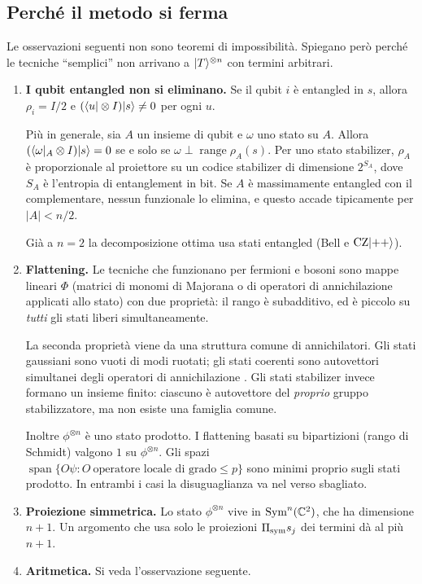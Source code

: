 \subsection{Perché il metodo si ferma}\label{sec:barriers}

Le osservazioni seguenti non sono teoremi di impossibilità. Spiegano però perché le tecniche ``semplici'' non arrivano a $\lvert T\rangle^{\otimes n}$ con termini arbitrari.

\begin{enumerate}[label=(B\arabic*),leftmargin=2.5em]
\item\label{B1} \textbf{I qubit entangled non si eliminano.} Se il qubit $i$ è entangled in $s$, allora $\rho_i=I/2$ e $(\langle u\rvert\otimes I)\lvert s\rangle\neq0$ per ogni $u$.

Più in generale, sia $A$ un insieme di qubit e $\omega$ uno stato su $A$. Allora $(\langle \omega\rvert_A\otimes I)\lvert s\rangle=0$ se e solo se $\omega\perp\operatorname{range}\rho_A(s)$. Per uno stato stabilizer, $\rho_A$ è proporzionale al proiettore su un codice stabilizer di dimensione $2^{S_A}$, dove $S_A$ è l'entropia di entanglement in bit. Se $A$ è massimamente entangled con il complementare, nessun funzionale lo elimina, e questo accade tipicamente per $|A|<n/2$.

Già a $n=2$ la decomposizione ottima usa stati entangled (Bell e $\mathrm{CZ}\lvert ++\rangle$).

\item\label{B2} \textbf{Flattening.} Le tecniche che funzionano per fermioni e bosoni sono mappe lineari $\Phi$ (matrici di monomi di Majorana o di operatori di annichilazione applicati allo stato) con due proprietà: il rango è subadditivo, ed è piccolo su \emph{tutti} gli stati liberi simultaneamente.

La seconda proprietà viene da una struttura comune di annichilatori. Gli stati gaussiani sono vuoti di modi ruotati; gli stati coerenti sono autovettori simultanei degli operatori di annichilazione \cite{RS26,WWLL26,CC26}. Gli stati stabilizer invece formano un insieme finito: ciascuno è autovettore del \emph{proprio} gruppo stabilizzatore, ma non esiste una famiglia comune.

Inoltre $\phi^{\otimes n}$ è uno stato prodotto. I flattening basati su bipartizioni (rango di Schmidt) valgono $1$ su $\phi^{\otimes n}$. Gli spazi $\operatorname{span}\{O\psi: O\ \text{operatore locale di grado}\le p\}$ sono minimi proprio sugli stati prodotto. In entrambi i casi la disuguaglianza va nel verso sbagliato.

\item\label{B3} \textbf{Proiezione simmetrica.} Lo stato $\phi^{\otimes n}$ vive in $\mathrm{Sym}^n(\mathbb C^2)$, che ha dimensione $n+1$. Un argomento che usa solo le proiezioni $\Pi_{\rm sym}s_j$ dei termini dà al più $n+1$.

\item\label{B4} \textbf{Aritmetica.} Si veda l'osservazione seguente.
\end{enumerate}

